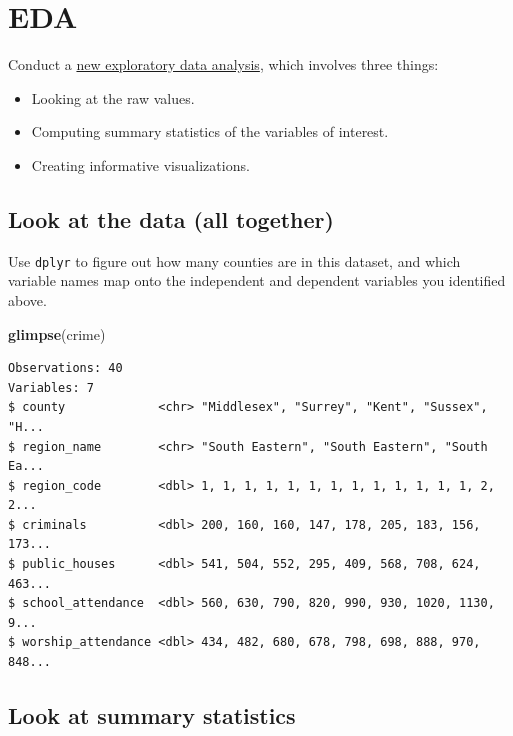 \documentclass[]{article}
\newenvironment{Shaded}{\begin{snugshade}}{\end{snugshade}}
\newcommand{\KeywordTok}[1]{\textcolor[rgb]{0.13,0.29,0.53}{\textbf{#1}}}
\newcommand{\NormalTok}[1]{#1}
\providecommand{\tightlist}{%
  \setlength{\itemsep}{0pt}\setlength{\parskip}{0pt}}
\begin{document}
\hypertarget{eda}{%
\section{EDA}\label{eda}}

Conduct a
\href{http://moderndive.netlify.com/6-regression.html\#model1EDA}{new
exploratory data analysis}, which involves three things:

\begin{itemize}
\tightlist
\item
  Looking at the raw values.
\item
  Computing summary statistics of the variables of interest.
\item
  Creating informative visualizations.
\end{itemize}

\hypertarget{look-at-the-data-all-together}{%
\subsection{Look at the data (all
together)}\label{look-at-the-data-all-together}}

Use \texttt{dplyr} to figure out how many counties are in this dataset,
and which variable names map onto the independent and dependent
variables you identified above.

\begin{Shaded}
\begin{Highlighting}[]
\KeywordTok{glimpse}\NormalTok{(crime)}
\end{Highlighting}
\end{Shaded}

\begin{verbatim}
Observations: 40
Variables: 7
$ county             <chr> "Middlesex", "Surrey", "Kent", "Sussex", "H...
$ region_name        <chr> "South Eastern", "South Eastern", "South Ea...
$ region_code        <dbl> 1, 1, 1, 1, 1, 1, 1, 1, 1, 1, 1, 1, 1, 2, 2...
$ criminals          <dbl> 200, 160, 160, 147, 178, 205, 183, 156, 173...
$ public_houses      <dbl> 541, 504, 552, 295, 409, 568, 708, 624, 463...
$ school_attendance  <dbl> 560, 630, 790, 820, 990, 930, 1020, 1130, 9...
$ worship_attendance <dbl> 434, 482, 680, 678, 798, 698, 888, 970, 848...
\end{verbatim}

\hypertarget{look-at-summary-statistics}{%
\subsection{Look at summary
statistics}\label{look-at-summary-statistics}}
\end{document}
